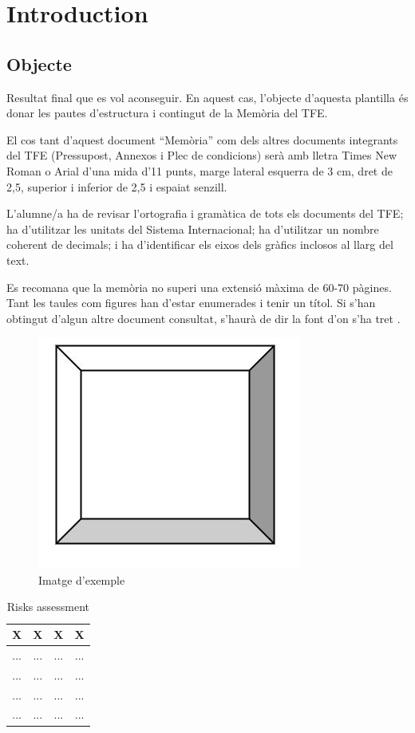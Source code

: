 \chapter{Introduction}

\section{Objecte}


Resultat final que es vol aconseguir. En aquest cas, l’objecte d’aquesta plantilla és donar les pautes d’estructura i contingut de la Memòria del TFE. 

El cos tant d’aquest document “Memòria” com dels altres documents integrants del TFE  (Pressupost, Annexos i Plec de condicions) serà amb lletra Times New Roman o Arial d’una mida d’11 punts, marge lateral esquerra de 3 cm, dret de 2,5, superior i inferior de 2,5 i espaiat senzill.

L’alumne/a ha de revisar l’ortografia i gramàtica de tots els documents del TFE; ha d’utilitzar les unitats del Sistema Internacional; ha d’utilitzar un nombre coherent de decimals; i ha d’identificar els eixos dels gràfics inclosos al llarg del text.

Es recomana que la memòria no superi una extensió màxima de 60-70 pàgines. 
Tant les taules com figures han d’estar enumerades i tenir un títol. Si s’han obtingut d’algun altre document consultat, s’haurà de dir la font d’on s’ha tret \cite{eseiaat}.


\begin{figure}[H]
    \centering
    \includegraphics[width=0.3
\linewidth]{Figures/IMATGE_EXEMPLE.jpg}
    \caption{Imatge d'exemple}
    \label{fig:Imatge d'exemple}
\end{figure}


\begin{table}[H]

  \centering
   \caption{Risks assessment} 
   
  \begin{tabular}{|c|c|c|c|}
    \hline
    \textbf{X} & \textbf{X} & \textbf{X} & \textbf{X} \\
    \hline
    ... & ... & ... & ...\\ \hline
    ... & ... & ... & ...\\ \hline
    ... & ... & ... & ...\\ \hline
    ... & ... & ... & ...\\ \hline
    
  \end{tabular}
  \label{tasks}
 
\end{table}


